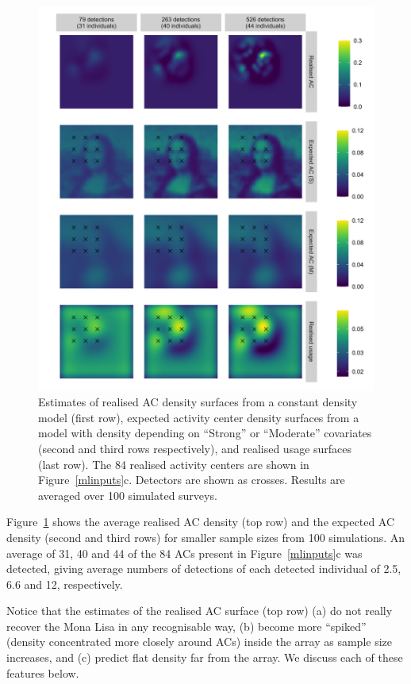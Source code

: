 \documentclass[useAMS,usenatbib,referee]{biom}
\begin{document}
\begin{figure}[htbp]
\centering
\includegraphics[width=1\textwidth]{mona_peaky_avgd.png}
\caption{Estimates of realised AC density surfaces from a constant density model (first row), expected activity center density surfaces from a model with density depending on ``Strong'' or ``Moderate'' covariates (second and third rows respectively), and realised usage surfaces (last row). The 84 realised activity centers are shown in Figure~\ref{mlinputs}c. Detectors are shown as crosses. Results are averaged over 100 simulated surveys.}
\label{mona_peaky_avgd}
\end{figure}

Figure~\ref{mona_peaky_avgd} shows the average realised AC density (top row) and the expected AC density (second and third rows) for smaller sample sizes  from 100 simulations. An average of 31, 40 and 44 of the 84 ACs present in Figure~\ref{mlinputs}c was detected, giving average numbers of detections of each detected individual of 2.5, 6.6 and 12, respectively.

Notice that the estimates of the realised AC surface (top row) (a) do not really recover the Mona Lisa in any recognisable way, (b) become more ``spiked'' (density concentrated more closely around ACs) inside the array as sample size increases, and (c) predict flat density far from the array. We discuss each of these features below.
\end{document}
